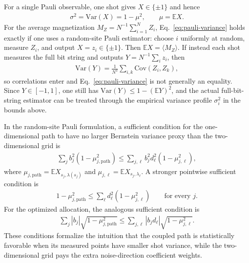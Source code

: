 \documentclass[aps,pra,reprint,groupedaddress,floatfix]{revtex4-2}
\newcommand{\mb}{\mathbb}
\begin{document}
For a single Pauli observable, one shot gives $X\in\{\pm1\}$ and hence
\begin{align}
\label{eq:pauli-variance}
    \sigma^2=\mathrm{Var}(X)=1-\mu^2,
    \qquad
    \mu=\mb E X.
\end{align}
For the average magnetization $M_Z=N^{-1}\sum_{i=1}^{N}Z_i$, Eq.~\eqref{eq:pauli-variance} holds exactly if one uses a random-site Pauli estimator: choose $i$ uniformly at random, measure $Z_i$, and output $X=z_i\in\{\pm1\}$. Then $\mb E X=\langle M_Z\rangle$. If instead each shot measures the full bit string and outputs $Y=N^{-1}\sum_i z_i$, then
\begin{align*}
    \mathrm{Var}(Y)
    =
    \frac{1}{N^2}\sum_{i,k}\mathrm{Cov}(Z_i,Z_k),
\end{align*}
so correlations enter and Eq.~\eqref{eq:pauli-variance} is not generally an equality. Since $Y\in[-1,1]$, one still has $\mathrm{Var}(Y)\le 1-(\mb E Y)^2$, and the actual full-bit-string estimator can be treated through the empirical variance profile $\sigma_i^2$ in the bounds above.

In the random-site Pauli formulation, a sufficient condition for the one-dimensional path to have no larger Bernstein variance proxy than the two-dimensional grid is
\begin{align}
\label{eq:variance-proxy-condition-equal}
    \sum_j b_j^2\left(1-\mu_{j,\mathrm{path}}^2\right)
    \le
    \sum_{j,\ell}b_j^2d_\ell^2\left(1-\mu_{j,\ell}^2\right),
\end{align}
where $\mu_{j,\mathrm{path}}=\mb E X_{s_j,\lambda(s_j)}$ and $\mu_{j,\ell}=\mb E X_{s_j,\lambda_\ell}$. A stronger pointwise sufficient condition is
\begin{align}
\label{eq:variance-proxy-condition-pointwise}
    1-\mu_{j,\mathrm{path}}^2
    \le
    \sum_\ell d_\ell^2\left(1-\mu_{j,\ell}^2\right)
    \qquad \text{for every } j.
\end{align}
For the optimized allocation, the analogous sufficient condition is
\begin{align}
\label{eq:variance-proxy-condition-opt}
    \sum_j |b_j|\sqrt{1-\mu_{j,\mathrm{path}}^2}
    \le
    \sum_{j,\ell}|b_jd_\ell|\sqrt{1-\mu_{j,\ell}^2}.
\end{align}
These conditions formalize the intuition that the coupled path is statistically favorable when its measured points have smaller shot variance, while the two-dimensional grid pays the extra noise-direction coefficient weights.
\end{document}
